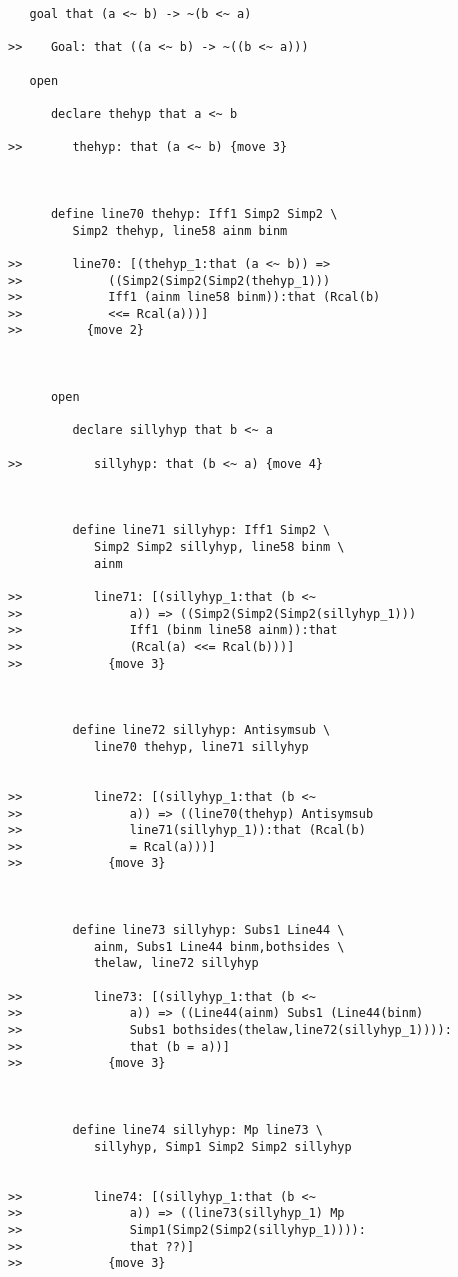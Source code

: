 \documentclass[12pt]{article}
\begin{document}
\begin{verbatim}
   goal that (a <~ b) -> ~(b <~ a)

>>    Goal: that ((a <~ b) -> ~((b <~ a)))

   open

      declare thehyp that a <~ b

>>       thehyp: that (a <~ b) {move 3}



      define line70 thehyp: Iff1 Simp2 Simp2 \
         Simp2 thehyp, line58 ainm binm

>>       line70: [(thehyp_1:that (a <~ b)) =>
>>            ((Simp2(Simp2(Simp2(thehyp_1)))
>>            Iff1 (ainm line58 binm)):that (Rcal(b)
>>            <<= Rcal(a)))]
>>         {move 2}



      open

         declare sillyhyp that b <~ a

>>          sillyhyp: that (b <~ a) {move 4}



         define line71 sillyhyp: Iff1 Simp2 \
            Simp2 Simp2 sillyhyp, line58 binm \
            ainm

>>          line71: [(sillyhyp_1:that (b <~
>>               a)) => ((Simp2(Simp2(Simp2(sillyhyp_1)))
>>               Iff1 (binm line58 ainm)):that
>>               (Rcal(a) <<= Rcal(b)))]
>>            {move 3}



         define line72 sillyhyp: Antisymsub \
            line70 thehyp, line71 sillyhyp


>>          line72: [(sillyhyp_1:that (b <~
>>               a)) => ((line70(thehyp) Antisymsub
>>               line71(sillyhyp_1)):that (Rcal(b)
>>               = Rcal(a)))]
>>            {move 3}



         define line73 sillyhyp: Subs1 Line44 \
            ainm, Subs1 Line44 binm,bothsides \
            thelaw, line72 sillyhyp

>>          line73: [(sillyhyp_1:that (b <~
>>               a)) => ((Line44(ainm) Subs1 (Line44(binm)
>>               Subs1 bothsides(thelaw,line72(sillyhyp_1)))):
>>               that (b = a))]
>>            {move 3}



         define line74 sillyhyp: Mp line73 \
            sillyhyp, Simp1 Simp2 Simp2 sillyhyp


>>          line74: [(sillyhyp_1:that (b <~
>>               a)) => ((line73(sillyhyp_1) Mp
>>               Simp1(Simp2(Simp2(sillyhyp_1)))):
>>               that ??)]
>>            {move 3}




\end{verbatim}
\end{document}
